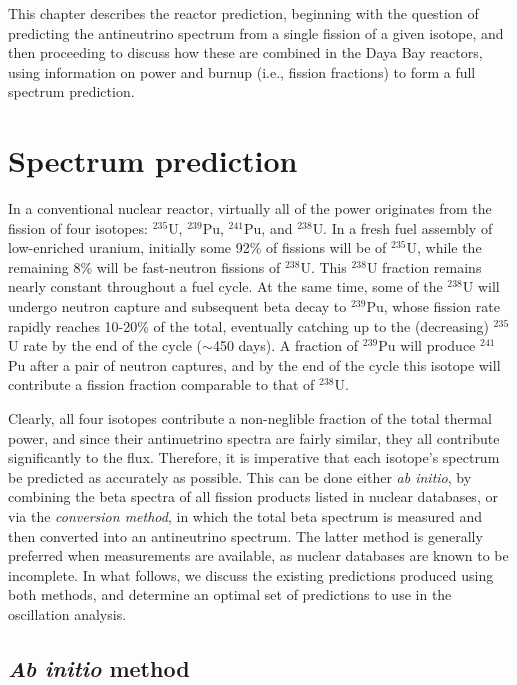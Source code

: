 \documentclass[../thesis.tex]{subfiles}
\begin{document}
This chapter describes the reactor prediction, beginning with the question of predicting the antineutrino spectrum from a single fission of a given isotope, and then proceeding to discuss how these are combined in the Daya Bay reactors, using information on power and burnup (i.e., fission fractions) to form a full spectrum prediction.

\section{Spectrum prediction}
\label{sec:specpred}

\def\urfive{$^{235}$U\xspace}
\def\punine{$^{239}$Pu\xspace}
\def\puone{$^{241}$Pu\xspace}
\def\ureight{$^{238}$U\xspace}

In a conventional nuclear reactor, virtually all of the power originates from the fission of four isotopes: \urfive, \punine, \puone, and \ureight. In a fresh fuel assembly of low-enriched uranium, initially some 92\% of fissions will be of \urfive, while the remaining 8\% will be fast-neutron fissions of \ureight. This \ureight fraction remains nearly constant throughout a fuel cycle. At the same time, some of the \ureight will undergo neutron capture and subsequent beta decay to \punine, whose fission rate rapidly reaches 10-20\% of the total, eventually catching up to the (decreasing) \urfive rate by the end of the cycle ($\sim$450 days). A fraction of \punine will produce \puone after a pair of neutron captures, and by the end of the cycle this isotope will contribute a fission fraction comparable to that of \ureight.

Clearly, all four isotopes contribute a non-neglible fraction of the total thermal power, and since their antinuetrino spectra are fairly similar, they all contribute significantly to the flux. Therefore, it is imperative that each isotope's spectrum be predicted as accurately as possible. This can be done either \emph{ab initio}, by combining the beta spectra of all fission products listed in nuclear databases, or via the \emph{conversion method}, in which the total beta spectrum is measured and then converted into an antineutrino spectrum. The latter method is generally preferred when measurements are available, as nuclear databases are known to be incomplete. In what follows, we discuss the existing predictions produced using both methods, and determine an optimal set of predictions to use in the oscillation analysis.

\subsection{\textit{Ab initio} method}
\label{sec:abinitio}
\end{document}
